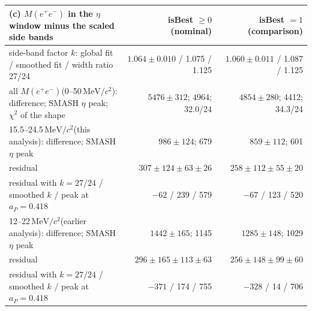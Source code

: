 \documentclass[11pt,a4paper]{article}
\newcommand{\Mee}{\ensuremath{M(e^{+}e^{-})}\xspace}
\newcommand{\MeVcc}{\ensuremath{\mathrm{MeV}/c^{2}}\xspace}
\newcommand{\aP}{\ensuremath{a_P}\xspace}
\begin{document}
\begin{table}[tbp]
\vspace{0.6em}
\setlength{\tabcolsep}{4pt}
\begin{tabularx}{\textwidth}{@{}L r r@{}}
\toprule
(c) \Mee in the $\eta$ window minus the scaled side bands & isBest $\ge0$ (nominal) & isBest $=1$ (comparison) \\
\midrule
side-band factor $k$: global fit / smoothed fit / width ratio 27/24 & $1.064\pm0.010$ / 1.075 / 1.125 & $1.060\pm0.011$ / 1.087 / 1.125 \\
all \Mee (0--50\,\MeVcc): difference; SMASH $\eta$ peak; $\chi^2$ of the shape & $5476\pm312$; 4964; 32.0/24 & $4854\pm280$; 4412; 34.3/24 \\
15.5--24.5\,\MeVcc (this analysis): difference; SMASH $\eta$ peak & $986\pm124$; 679 & $859\pm112$; 601 \\
\quad residual & $307\pm124\pm63\pm26$ & $258\pm112\pm55\pm20$ \\
\quad residual with $k=27/24$ / smoothed $k$ / peak at $\aP=0.418$ & $-62$ / 239 / 579 & $-67$ / 123 / 520 \\
12--22\,\MeVcc (earlier analysis): difference; SMASH $\eta$ peak & $1442\pm165$; 1145 & $1285\pm148$; 1029 \\
\quad residual & $296\pm165\pm113\pm63$ & $256\pm148\pm99\pm60$ \\
\quad residual with $k=27/24$ / smoothed $k$ / peak at $\aP=0.418$ & $-371$ / 174 / 755 & $-328$ / 14 / 706 \\
\bottomrule
\end{tabularx}
\end{table}
\end{document}
